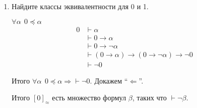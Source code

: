 \begin{enumerate}
\begin{enumerate}[wide, labelwidth=!, labelindent=0pt]
\begin{itemize}
\begin{enumerate}
                                        \begin{prooftree}
                                        \end{prooftree}
                              \end{enumerate}
                    \end{itemize}

              \item Найдите классы эквивалентности для 0 и 1.

                    \(\forall \alpha \ \ 0 \preceq \alpha\)
                    \begin{align*}
                        0 & \vdash \alpha                                            \\
                          & \vdash 0 \to \alpha                                      \\
                          & \vdash 0 \to \neg\alpha                                  \\
                          & \vdash (0 \to \alpha) \to (0 \to \neg \alpha) \to \neg 0 \\
                          & \vdash \neg 0
                    \end{align*}

                    Итого \(\forall \alpha \ \ 0 \preceq \alpha \Rightarrow \vdash \neg 0\). Докажем ``\( \Leftarrow \)''.

                    \begin{prooftree}
                    \end{prooftree}

                    Итого \([0]_\approx\) есть множество формул \(\beta\), таких что \(\vdash \neg \beta\).


\end{enumerate}
\end{enumerate}
